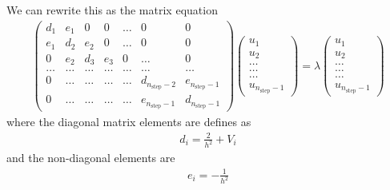 \documentclass[11pt, a4paper]{article}
\begin{document}
			We can rewrite this as the matrix equation
			\begin{align}
			 	\begin{pmatrix} d_1 		& e_1 	& 0   	& 0    	& \dots  	&0     								& 0 \\
                                			e_1 		& d_2 	& e_2 	& 0    	& \dots  	&0     								&0 \\
                               	 		0   		& e_2 	& d_3 	& e_3  	&0       		&\dots 								& 0\\
                                			\dots  	& \dots 	& \dots 	& \dots	&\dots     	&\dots	 							& \dots\\
                                			0   		& \dots 	& \dots 	& \dots 	&\dots      	&d_{n_{\mathrm{step}}-2}	& e_{n_{\mathrm{step}}-1}\\
                                			0   		& \dots 	& \dots 	& \dots 	&\dots      	&e_{n_{\mathrm{step}}-1}	& d_{n_{\mathrm{step}}-1}
            		\end{pmatrix}        
            		\begin{pmatrix} 	u_{1} \\
                                            	u_{2} \\
                                          	\dots \\
                                          	\dots \\ 
                                          	\dots \\
                                            	u_{n_{\mathrm{step}}-1}
             	\end{pmatrix}
             	=\lambda
             	\begin{pmatrix} 	u_{1} \\
                                           	u_{2} \\
                                            	\dots \\ 
                                            	\dots \\ 
                                            	\dots\\
                             				u_{n_{\mathrm{step}}-1}
            		\end{pmatrix} 
      \label{eq: matrix eigenvalue equation}
      \end{align}
      where the diagonal matrix elements are defines as
		\begin{align*}
			d_i = \frac{2}{h^2} + V_i
		\end{align*}
		and the non-diagonal elements are
		\begin{align*}
			e_i = -\frac{1}{h^2}
		\end{align*}
	
\end{document}
